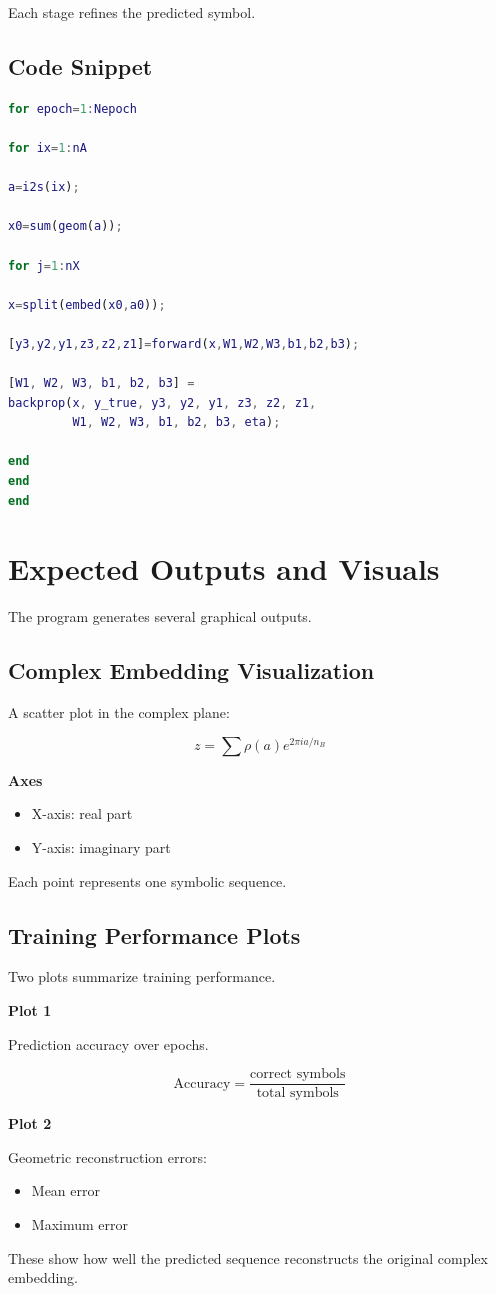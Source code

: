 Each stage refines the predicted symbol.

\subsection{Code Snippet}

\begin{lstlisting}[language=Matlab]
for epoch=1:Nepoch

for ix=1:nA

a=i2s(ix);

x0=sum(geom(a));

for j=1:nX

x=split(embed(x0,a0));

[y3,y2,y1,z3,z2,z1]=forward(x,W1,W2,W3,b1,b2,b3);

[W1, W2, W3, b1, b2, b3] =
backprop(x, y_true, y3, y2, y1, z3, z2, z1,
         W1, W2, W3, b1, b2, b3, eta);

end
end
end
\end{lstlisting}

\newpage

\section{Expected Outputs and Visuals}

The program generates several graphical outputs.

\subsection{Complex Embedding Visualization}

A scatter plot in the complex plane:

\[
z = \sum \rho(a)e^{2\pi ia/n_B}
\]

\textbf{Axes}

\begin{itemize}
\item X-axis: real part
\item Y-axis: imaginary part
\end{itemize}

Each point represents one symbolic sequence.

\subsection{Training Performance Plots}

Two plots summarize training performance.

\textbf{Plot 1}

Prediction accuracy over epochs.

\[
\text{Accuracy} =
\frac{\text{correct symbols}}{\text{total symbols}}
\]

\textbf{Plot 2}

Geometric reconstruction errors:

\begin{itemize}
\item Mean error
\item Maximum error
\end{itemize}

These show how well the predicted sequence reconstructs the original complex embedding.
